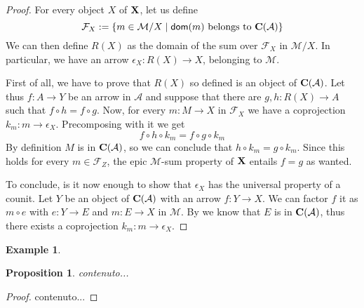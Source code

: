 \documentclass[a4paper]{article}
\newcommand{\dm}[1]{\mathsf{dom}({#1})}
\def\C{\textbf {\textup{C}}}
\def\X{\textbf {\textup{X}}}
\newtheorem{proposition}[theorem]{Proposition}
\theoremstyle{definition}
\newtheorem{example}[theorem]{Example}
\begin{document}
\begin{proof}
For every object $X$ of $\X$, let us define
\[\mathcal{F}_X:=\{m\in \mathcal{M}/X \mid \dm{m} \text{ belongs to } \C(\mathcal{A})\}\] 
We can then define $R(X)$ as the domain of the sum over $\mathcal{F}_X$ in $\mathcal{M}/X$. In particular, we have an arrow $\epsilon_X\colon R(X)\to X$, belonging to $\mathcal{M}$.

First of all, we have to prove that $R(X)$ so defined is an object of $\C(\mathcal{A})$. Let thus $f\colon A\to Y$ be an arrow in $\mathcal{A}$ and suppose that there are $g,h\colon R(X)\to A$ such that  $f\circ h= f \circ g$. Now, for every $m\colon M\to X$ in $\mathcal{F}_X$ we have a coprojection $k_m\colon m\to \epsilon_X$. Precomposing with it we get
\[f\circ h \circ k_m=f\circ g\circ k_m\]
By definition $M$ is in $\C(\mathcal{A})$, so we can conclude that $h\circ k_m=g\circ k_m$. Since  this holds for every $m\in \mathcal{F}_Z$, the epic $\mathcal{M}$-sum property of $\X$ entails $f=g$ as wanted.

To conclude, is it now enough to show that $\epsilon_X$ has the universal property of a counit. Let $Y$ be an object of $\C(\mathcal{A})$ with an arrow $f\colon Y\to X$. We can factor $f$ it as $m\circ e$ with $e\colon Y\to E$ and $m\colon E\to X$ in $\mathcal{M}$. By  we know that $E$ is in $\C(\mathcal{A})$, thus there exists a coprojection $k_m\colon m\to \epsilon_X$. 
\end{proof}

\begin{example}
\end{example}


\begin{proposition}
	contenuto...
\end{proposition}
\begin{proof}
	contenuto...
\end{proof}
\end{document}
